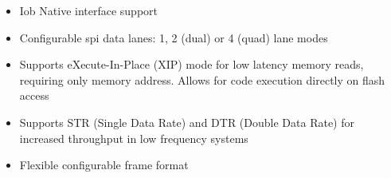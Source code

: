  \begin{itemize}
	\item Iob Native interface support
	\item Configurable spi data lanes: 1, 2 (dual) or 4 (quad) lane modes
	\item Supports eXecute-In-Place (XIP) mode for low latency
		memory reads, requiring only memory address. Allows for code execution
		directly on flash
		access
	\item Supports STR (Single Data Rate) and DTR (Double Data Rate) for increased
		throughput in low frequency systems
	\item Flexible configurable frame format
 \end{itemize}
